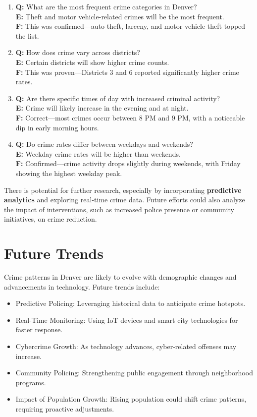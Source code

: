 \documentclass{article}
\begin{document}
\begin{enumerate}
    \item \textbf{Q:} What are the most frequent crime categories in Denver? \\
    \textbf{E:} Theft and motor vehicle-related crimes will be the most frequent. \\
    \textbf{F:} This was confirmed—auto theft, larceny, and motor vehicle theft topped the list.

    \item \textbf{Q:} How does crime vary across districts? \\
    \textbf{E:} Certain districts will show higher crime counts. \\
    \textbf{F:} This was proven—Districts 3 and 6 reported significantly higher crime rates.

    \item \textbf{Q:} Are there specific times of day with increased criminal activity? \\
    \textbf{E:} Crime will likely increase in the evening and at night. \\
    \textbf{F:} Correct—most crimes occur between 8 PM and 9 PM, with a noticeable dip in early morning hours.

    \item \textbf{Q:} Do crime rates differ between weekdays and weekends? \\
    \textbf{E:} Weekday crime rates will be higher than weekends. \\
    \textbf{F:} Confirmed—crime activity drops slightly during weekends, with Friday showing the highest weekday peak.
\end{enumerate}

There is potential for further research, especially by incorporating \textbf{predictive analytics} and exploring real-time crime data. Future efforts could also analyze the impact of interventions, such as increased police presence or community initiatives, on crime reduction.


\section{Future Trends}
\label{sec
}

Crime patterns in Denver are likely to evolve with demographic changes and advancements in technology. Future trends include:

\begin{itemize} \item Predictive Policing: Leveraging historical data to anticipate crime hotspots. \item Real-Time Monitoring: Using IoT devices and smart city technologies for faster response. \item Cybercrime Growth: As technology advances, cyber-related offenses may increase. \item Community Policing: Strengthening public engagement through neighborhood programs. \item Impact of Population Growth: Rising population could shift crime patterns, requiring proactive adjustments. \end{itemize}
\end{document}
